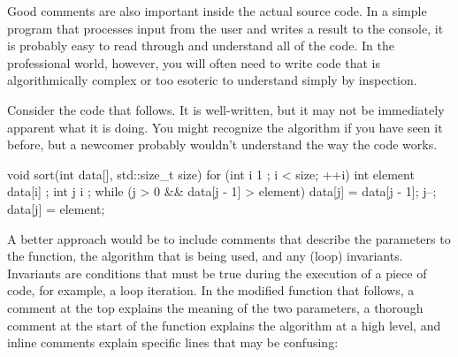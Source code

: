 
Good comments are also important inside the actual source code. In a simple program that processes input from the user and writes a result to the console, it is probably easy to read through and understand all of the code. In the professional world, however, you will often need to write code that is algorithmically complex or too esoteric to understand simply by inspection.

Consider the code that follows. It is well-written, but it may not be immediately apparent what it is doing. You might recognize the algorithm if you have seen it before, but a newcomer probably wouldn’t understand the way the code works.

\begin{cpp}
void sort(int data[], std::size_t size)
{
    for (int i { 1 }; i < size; ++i) {
        int element { data[i] };
        int j { i };
        while (j > 0 && data[j - 1] > element) {
            data[j] = data[j - 1];
            j--;
        }
        data[j] = element;
    }
}
\end{cpp}

A better approach would be to include comments that describe the parameters to the function, the algorithm that is being used, and any (loop) invariants. Invariants are conditions that must be true during the execution of a piece of code, for example, a loop iteration. In the modified function that follows, a comment at the top explains the meaning of the two parameters, a thorough comment at the start of the function explains the algorithm at a high level, and inline comments explain specific lines that may be confusing:

